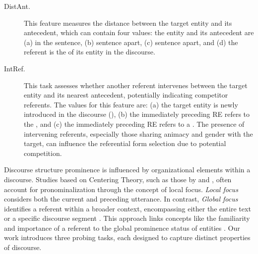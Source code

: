 \begin{description}
	\item[DistAnt.] This feature measures the distance between the target entity and its antecedent, which can contain four values: the entity and its antecedent are (a) in the  sentence, (b)  sentence apart, (c)  sentence apart, and (d) the referent is the  of its entity in the discourse. 
	\item[IntRef.] This task assesses whether another referent intervenes between the target entity and its nearest antecedent, potentially indicating competitor referents. The values for this feature are: (a) the target entity is newly introduced in the discourse (), (b) the immediately preceding RE refers to the , and (c) the immediately preceding RE refers to a . The presence of intervening referents, especially those sharing animacy and gender with the target, can influence the referential form selection due to potential competition.
\end{description}



Discourse structure prominence is influenced by organizational elements within a discourse. Studies based on Centering Theory, such as those by \citet{grosz1995centering} and \citet{henschel2000pronominalization}, often account for pronominalization through the concept of local focus. \emph{Local focus} considers both the current and preceding utterance. In contrast, \emph{Global focus} identifies a referent within a broader context, encompassing either the entire text or a specific discourse segment \citep{hinterwimmer2019prominent}. This approach links concepts like the familiarity and importance of a referent to the global prominence status of entities \citep{siddharthan2011information}. Our work introduces three probing tasks, each designed to capture distinct properties of discourse.

